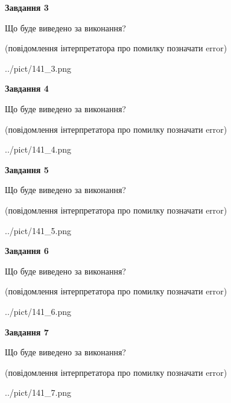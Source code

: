 \documentclass[12pt, ukrainian]{article}
\begin{document}
{\begin {large}
{\begin {center}\textbf{Завдання 3}\end {center}}\par
Що буде виведено за виконання?\par
 (повідомлення інтерпретатора про помилку позначати error)\par
\begin{center}
	{../pict/141_3.png}
\end{center}
\newpage

{\begin {center}\textbf{Завдання 4}\end {center}}\par
Що буде виведено за виконання?\par
 (повідомлення інтерпретатора про помилку позначати error)\par
\begin{center}
	{../pict/141_4.png}
\end{center}
\newpage

{\begin {center}\textbf{Завдання 5}\end {center}}\par
Що буде виведено за виконання?\par
 (повідомлення інтерпретатора про помилку позначати error)\par
\begin{center}
	{../pict/141_5.png}
\end{center}
\newpage

{\begin {center}\textbf{Завдання 6}\end {center}}\par
Що буде виведено за виконання?\par
 (повідомлення інтерпретатора про помилку позначати error)\par
\begin{center}
	{../pict/141_6.png}
\end{center}
\newpage

{\begin {center}\textbf{Завдання 7}\end {center}}\par
Що буде виведено за виконання?\par
 (повідомлення інтерпретатора про помилку позначати error)\par
\begin{center}
	{../pict/141_7.png}
\end{center}
\newpage


\end{large}}
\end{document}
